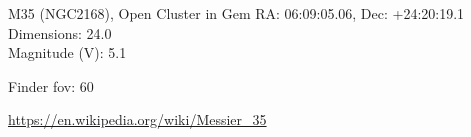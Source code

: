 \begin{block}{M35 (NGC2168), Open Cluster in Gem}
    RA: 06:09:05.06, Dec: +24:20:19.1 \\ 
    Dimensions: 24.0 \\ 
    Magnitude (V): 5.1



    Finder fov: 60 

    \url{https://en.wikipedia.org/wiki/Messier_35} 
\end{block}